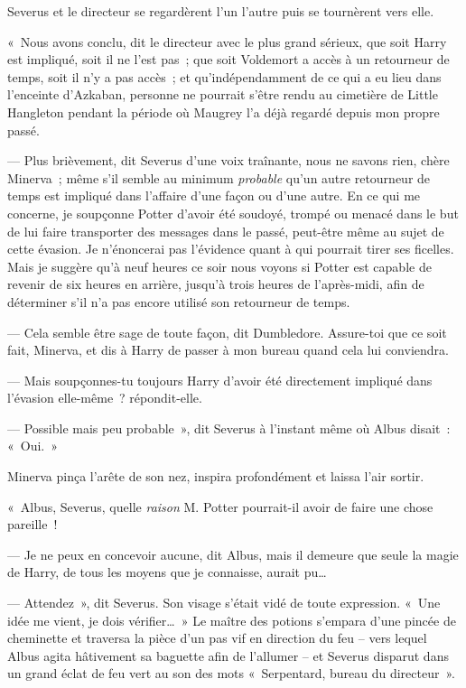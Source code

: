 Severus et le directeur se regardèrent l'un l'autre puis se tournèrent vers elle.

«~Nous avons conclu, dit le directeur avec le plus grand sérieux, que soit Harry est impliqué, soit il ne l'est pas~; que soit Voldemort a accès à un retourneur de temps, soit il n'y a pas accès~; et qu'indépendamment de ce qui a eu lieu dans l'enceinte d'Azkaban, personne ne pourrait s'être rendu au cimetière de Little Hangleton pendant la période où Maugrey l'a déjà regardé depuis mon propre passé.

--- Plus brièvement, dit Severus d'une voix traînante, nous ne savons rien, chère Minerva~; même s'il semble au minimum \emph{probable} qu'un autre retourneur de temps est impliqué dans l'affaire d'une façon ou d'une autre.
En ce qui me concerne, je soupçonne Potter d'avoir été soudoyé, trompé ou menacé dans le but de lui faire transporter des messages dans le passé, peut-être même au sujet de cette évasion.
Je n'énoncerai pas l'évidence quant à qui pourrait tirer ses ficelles.
Mais je suggère qu'à neuf heures ce soir nous voyons si Potter est capable de revenir de six heures en arrière, jusqu'à trois heures de l'après-midi, afin de déterminer s'il n'a pas encore utilisé son retourneur de temps.

--- Cela semble être sage de toute façon, dit Dumbledore.
Assure-toi que ce soit fait, Minerva, et dis à Harry de passer à mon bureau quand cela lui conviendra.

--- Mais soupçonnes-tu toujours Harry d'avoir été directement impliqué dans l'évasion elle-même~? répondit-elle.

--- Possible mais peu probable~», dit Severus à l'instant même où Albus disait~: «~Oui.~»

Minerva pinça l'arête de son nez, inspira profondément et laissa l'air sortir.

«~Albus, Severus, quelle \emph{raison} M. Potter pourrait-il avoir de faire une chose pareille~!

--- Je ne peux en concevoir aucune, dit Albus, mais il demeure que seule la magie de Harry, de tous les moyens que je connaisse, aurait pu…

--- Attendez~», dit Severus.
Son visage s'était vidé de toute expression.
«~Une idée me vient, je dois vérifier…~»
Le maître des potions s'empara d'une pincée de cheminette et traversa la pièce d'un pas vif en direction du feu -- vers lequel Albus agita hâtivement sa baguette afin de l'allumer -- et Severus disparut dans un grand éclat de feu vert au son des mots «~Serpentard, bureau du directeur~».

